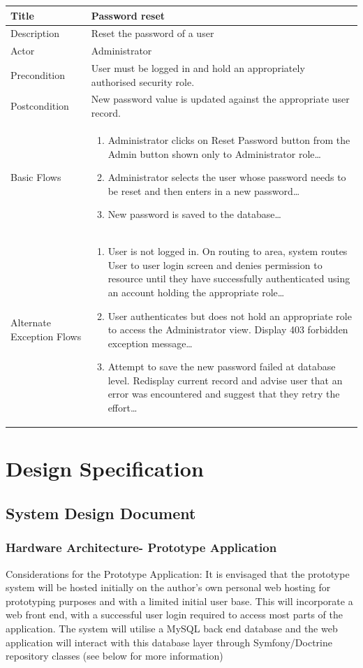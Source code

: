 \documentclass[a4paper,Times New Roman 11pt]{article}
\newcommand\addrow[2]{#1 &#2\\ }
\newcommand\addheading[2]{#1 &#2\\ \hline}
\newcommand\tabularhead{\begin{tabular}{lp{9cm}}
\hline
}
\newcommand\addmulrow[2]{ \begin{minipage}[t][][t]{3cm}#1\end{minipage}%
   &\begin{minipage}[t][][t]{9cm}
    \begin{enumerate} #2   \end{enumerate}
    \end{minipage}\\ }
\newenvironment{usecase}{\tabularhead}
{\hline\end{tabular}}
\begin{document}
\begin{samepage}
\begin{usecase}
   \addheading{Title}{Password reset}
  \addheading{Description}{Reset the password of a user}
  \addheading{Actor}{Administrator} 
  \addrow{Precondition}{User must be logged in and hold an appropriately authorised security role.}
  \addrow{Postcondition}{New password value is updated against the appropriate user record.}
  \addmulrow{Basic Flows}{\item Administrator clicks on Reset Password button from the Admin button shown only to Administrator role\ldots
  \newpage
  \item Administrator selects the user whose password needs to be reset and then enters in a new password\ldots
  \item New password is saved to the database\ldots}
  \addmulrow{Alternate Exception Flows}{\item User is not logged in. On routing to area, system routes User to user login screen and denies permission to resource until they have successfully authenticated using an account holding the appropriate role\ldots
                                                                      \item User authenticates but does not hold an appropriate role to access the Administrator  view. Display 403 forbidden exception message\ldots
                                                                      \item Attempt to save the new password failed at database level. Redisplay current record and advise user that an error was encountered and suggest that they retry the effort\ldots}
\end{usecase}

\end{samepage}
\newpage
\section{Design Specification}
\subsection {System Design Document}
\subsubsection{Hardware Architecture- Prototype Application}

Considerations for the Prototype Application: It is envisaged that the prototype system will be hosted initially on the author's own personal web hosting for prototyping purposes and with a limited initial user base. This will incorporate a web front end, with a successful user login required to access most parts of the application. The system will utilise a MySQL back end database and the web application will interact with this database layer through Symfony/Doctrine repository classes (see below for more information)
\end{document}
